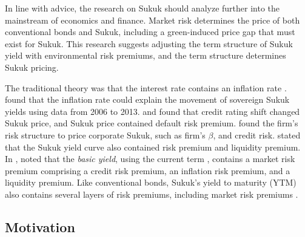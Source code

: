 \documentclass[sn-basic]{sn-jnl}%
\theoremstyle{thmstyleone}%
\theoremstyle{thmstyletwo}%
\theoremstyle{thmstylethree}%
\begin{document}

In line with \citet{zulkhibri2015synthesis} advice, the research on Sukuk should analyze further into the mainstream of economics and finance. Market risk determines the price of both conventional bonds and Sukuk, including a green-induced price gap that must exist for Sukuk. This research suggests adjusting the term structure of Sukuk yield with environmental risk premiums, and the term structure determines Sukuk pricing.

The traditional theory was that the interest rate contains an inflation rate \citep{fisher1896appreciation}. \citet{rahman2017sovereign} found that the inflation rate could explain the movement of sovereign Sukuk yields using data from 2006 to 2013. \citet{shahida2014predicting} and \citet{ng2019does} found that credit rating shift changed Sukuk price, and Sukuk price contained default risk premium. \citet{safari2013debt} found the firm's risk structure to price corporate Sukuk, such as firm's $\beta$, and credit risk. \citet{awaludin2015sukuk} stated that the Sukuk yield curve also contained risk premium and liquidity premium. In \citeyear{durand1942basic}, \citeauthor{durand1942basic} noted that the \emph{basic yield}, using the current term \citep[pp. 17]{fabozzi2007fixed}, contains a market risk premium comprising a credit risk premium, an inflation risk premium, and a liquidity premium. Like conventional bonds, Sukuk’s yield to maturity (YTM) also contains several layers of risk premiums, including market risk premiums \citep{tariq2007risks,al2013sukuk}.

\subsection{Motivation}
\end{document}

